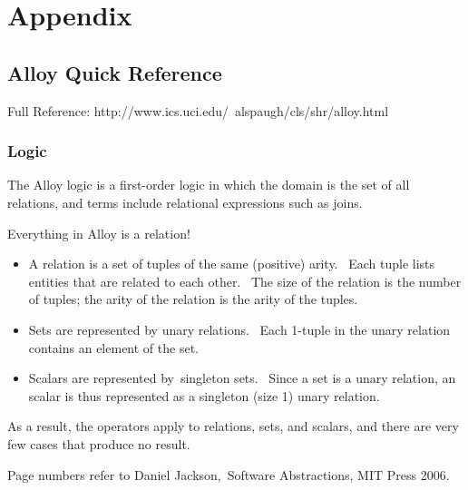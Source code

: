 \documentclass[oneside]{book}
\begin{document}
\chapter{Appendix}
\section{Alloy Quick Reference}

Full Reference: http://www.ics.uci.edu/~alspaugh/cls/shr/alloy.html

\subsection{Logic}
The Alloy logic is a first-order logic in which the domain is the set of all relations, and terms include relational expressions such as joins.~

Everything in Alloy is a relation!~

\begin{itemize}
\item A relation is a set of tuples of the same (positive) arity.~ Each tuple lists entities that are related to each other.~ The size of the relation is the number of tuples; the arity of the relation is the arity of the tuples.~
\item Sets are represented by unary relations.~ Each 1-tuple in the unary relation contains an element of the set.~
\item Scalars are represented by~singleton sets.~ Since a set is a unary relation, an scalar is thus represented as a singleton (size 1) unary relation.~
\end{itemize}
As a result, the operators apply to relations, sets, and scalars, and there are very few cases that produce no result.~

Page numbers refer to Daniel Jackson,~Software Abstractions, MIT Press 2006.~

\newpage
\end{document}
